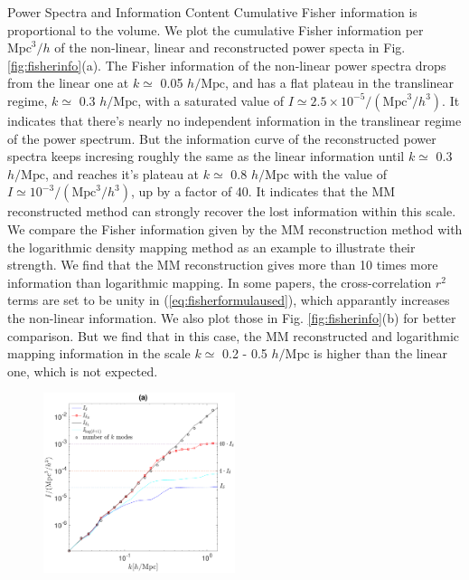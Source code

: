 \begin{section}{Power Spectra and Information Content}
  Cumulative Fisher information is proportional to the volume. We plot the 
cumulative Fisher information per $\mathrm{Mpc}^3/h$ of the non-linear, linear and reconstructed power specta in 
Fig.\ref{fig:fisherinfo}(a). The Fisher information of the non-linear power spectra drops 
from the linear one at $k \simeq$ 0.05 $h/\mathrm{Mpc}$, and has a flat plateau in the translinear regime, 
$k\simeq$ 0.3 $h/\mathrm{Mpc}$, with 
a saturated value of $I \simeq 2.5 \times 10^{-5}/(\mathrm{Mpc}^3/h^3)$. It 
indicates that there's nearly no independent information in the translinear regime of the power 
spectrum.
But the information curve of 
the reconstructed power spectra keeps incresing roughly the same as 
the linear information until $k\simeq$ 0.3 $h/\mathrm{Mpc}$, and reaches it's plateau at $k\simeq$ 0.8 $h/\mathrm{Mpc}$ with the 
value of $I \simeq  10^{-3}/(\mathrm{Mpc}^3/h^3)$, up by a factor of  40. 
It indicates that the MM reconstructed method can strongly recover the lost information 
within this scale. We compare the Fisher information given by the MM reconstruction method with 
the logarithmic density mapping method \cite{bib:Mark2009} as an example to illustrate their strength. 
We find that the MM reconstruction gives more than 10 times more information than logarithmic mapping. 
In some papers, the cross-correlation $r^2$ terms are set to be unity in (\ref{eq:fisherformulaused}), which 
apparantly increases the non-linear information. We also plot those in Fig. \ref{fig:fisherinfo}(b) 
for better comparison. But we find that in this case, the MM reconstructed and logarithmic mapping information in the scale 
$k \simeq$ 0.2 - 0.5 $h/\mathrm{Mpc}$ is higher than the linear one, which is not expected. 
\begin{figure}
  \includegraphics[width=0.5\textwidth]{fisher_r2_best_analysis-crop.pdf}

\end{figure}
\end{section}
